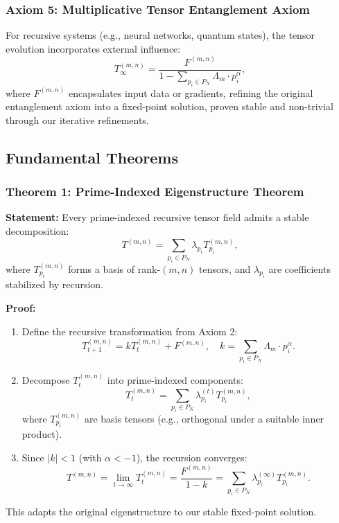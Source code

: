 \documentclass[12pt]{article}
\begin{document}
 \subsubsection{Axiom 5: Multiplicative Tensor Entanglement Axiom}
For recursive systems (e.g., neural networks, quantum states), the tensor evolution incorporates external influence:
\begin{equation}
    T_\infty^{(m,n)} = \frac{F^{(m,n)}}{1 - \sum_{p_i \in P_N} \Lambda_m \cdot p_i^\alpha},
\end{equation}
where \( F^{(m,n)} \) encapsulates input data or gradients, refining the original entanglement axiom into a fixed-point solution, proven stable and non-trivial through our iterative refinements.

 \subsection{Fundamental Theorems}

 \subsubsection{Theorem 1: Prime-Indexed Eigenstructure Theorem}
\textbf{Statement:} Every prime-indexed recursive tensor field admits a stable decomposition:
\begin{equation}
    T^{(m,n)} = \sum_{p_i \in P_N} \lambda_{p_i} T_{p_i}^{(m,n)},
\end{equation}
where \( T_{p_i}^{(m,n)} \) forms a basis of rank-$(m,n)$ tensors, and \( \lambda_{p_i} \) are coefficients stabilized by recursion.

\textbf{Proof:}
\begin{enumerate}
    \item Define the recursive transformation from Axiom 2:
    \[
    T_{t+1}^{(m,n)} = k T_t^{(m,n)} + F^{(m,n)}, \quad k = \sum_{p_i \in P_N} \Lambda_m \cdot p_i^\alpha.
    \]
    \item Decompose \( T_t^{(m,n)} \) into prime-indexed components:
    \[
    T_t^{(m,n)} = \sum_{p_i \in P_N} \lambda_{p_i}^{(t)} T_{p_i}^{(m,n)},
    \]
    where \( T_{p_i}^{(m,n)} \) are basis tensors (e.g., orthogonal under a suitable inner product).
    \item Since \( |k| < 1 \) (with \( \alpha < -1 \)), the recursion converges:
    \[
    T^{(m,n)} = \lim_{t \to \infty} T_t^{(m,n)} = \frac{F^{(m,n)}}{1 - k} = \sum_{p_i \in P_N} \lambda_{p_i}^{(\infty)} T_{p_i}^{(m,n)}.
    \]
\end{enumerate}
This adapts the original eigenstructure to our stable fixed-point solution.
\end{document}
